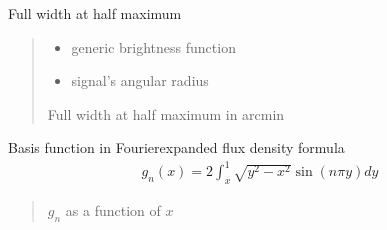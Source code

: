 \documentclass[letterpaper,10pt,english]{sphinxmanual}
\begin{document}

\begin{fulllineitems}
\label{\detokenize{diffsph.utils:diffsph.utils.tools.fwhm}}
\pysigstartsignatures
{}
\pysigstopsignatures
\sphinxAtStartPar
Full width at half maximum
\begin{quote}\begin{description}
\begin{itemize}
\item {} 
\sphinxAtStartPar
{} \textendash{} generic brightness function

\item {} 
\sphinxAtStartPar
{} \textendash{} signal’s angular radius

\end{itemize}

\sphinxAtStartPar
Full width at half maximum in arcmin

\end{description}\end{quote}

\end{fulllineitems}


\begin{fulllineitems}
\label{\detokenize{diffsph.utils:diffsph.utils.tools.g}}
\pysigstartsignatures
{}
\pysigstopsignatures
\sphinxAtStartPar
Basis function in Fourier\sphinxhyphen{}expanded flux density formula
\begin{equation*}
\begin{split}g_n(x)=2\int_x^1\sqrt{y^2-x^2}\sin(n\pi y) dy\end{split}
\end{equation*}\begin{quote}\begin{description}
\sphinxAtStartPar
\(g_n\) as a function of \(x\)

\end{description}\end{quote}

\end{fulllineitems}
\end{document}
